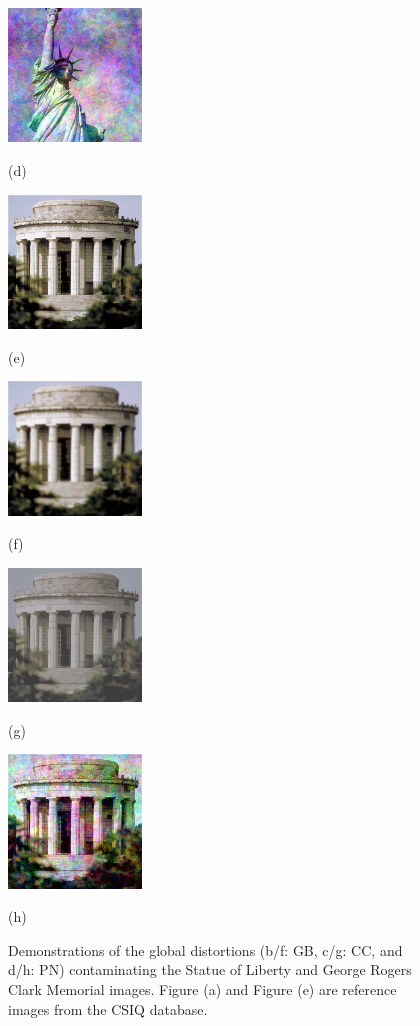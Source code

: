 \begin{figure}[!]
		\begin{minipage}[t]{.24\linewidth}
			\includegraphics[width=1.4in]{CSIQ/lady_liberty.fnoise.5.jpg}
			\centerline{(d)}
		\end{minipage}
		\begin{minipage}[t]{.24\linewidth}
			\includegraphics[width=1.4in]{CSIQ/monument.jpg}
			\centerline{(e)}
		\end{minipage}
		\begin{minipage}[t]{.24\linewidth}
			\includegraphics[width=1.4in]{CSIQ/monument.BLUR.4.jpg}
			\centerline{(f)}
		\end{minipage}
		\begin{minipage}[t]{.24\linewidth}
			\includegraphics[width=1.4in]{CSIQ/monument.contrast.5.jpg}
			\centerline{(g)}
		\end{minipage}
		\begin{minipage}[t]{.24\linewidth}
			\includegraphics[width=1.4in]{CSIQ/monument.fnoise.5.jpg}
			\centerline{(h)}
		\end{minipage}
		\caption{Demonstrations of the global distortions (b/f: GB, c/g: CC, and d/h: PN) contaminating the Statue of Liberty and George Rogers Clark Memorial images. Figure (a) and Figure (e) are reference images from the CSIQ database.}
		\label{CSIQ-Distortion}
	\end{figure}
	
